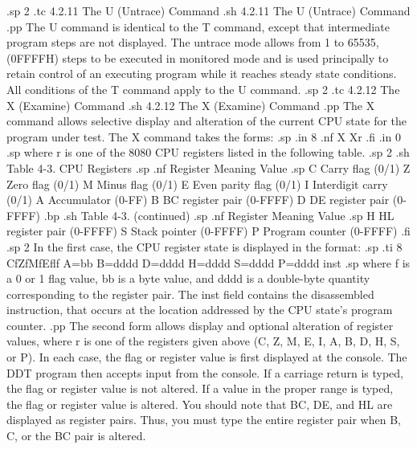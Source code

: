 .sp 2
.tc         4.2.11 The U (Untrace) Command
.sh
4.2.11  The U (Untrace) Command
.pp
The U command is identical to the T command, except that 
intermediate program steps are not displayed.  The untrace mode 
allows from 1 to 65535, (0FFFFH) steps to be executed in monitored 
mode and is used principally to retain control of an executing 
program while it reaches steady state conditions.  All conditions 
of the T command apply to the U command.
.sp 2
.tc         4.2.12 The X (Examine) Command
.sh
4.2.12  The X (Examine) Command
.pp
The X command allows selective display and alteration of the 
current CPU state for the program under test.  The X command 
takes the forms:
.sp
.in 8
.nf
X
Xr
.fi
.in 0
.sp
where r is one of the 8080 CPU registers listed in the following table.
.sp 2
.sh
                    Table 4-3.  CPU Registers
.sp
.nf
            Register        Meaning           Value
.sp
               C        Carry flag            (0/1)
               Z        Zero flag             (0/1)
               M        Minus flag            (0/1)
               E        Even parity flag      (0/1)
               I        Interdigit carry      (0/1)
               A        Accumulator           (0-FF)
               B        BC register pair      (0-FFFF)
               D        DE register pair      (0-FFFF)
.bp
.sh
                     Table 4-3.  (continued)
.sp
.nf
            Register        Meaning           Value
.sp
               H        HL register pair      (0-FFFF)
               S        Stack pointer         (0-FFFF)
               P        Program counter       (0-FFFF)
.fi
.sp 2
In the first case, the CPU register state is displayed in the 
format:
.sp
.ti 8
CfZfMfEflf A=bb B=dddd D=dddd H=dddd S=dddd P=dddd inst
.sp
where f is a 0 or 1 flag value, bb is a byte value, and dddd is a 
double-byte quantity corresponding to the register pair.  The 
inst field contains the disassembled instruction, that occurs at 
the location addressed by the CPU state's program counter.
.pp
The second form allows display and optional alteration of 
register values, where r is one of the registers given above (C, 
Z, M, E, I, A, B, D, H, S, or P).  In each case, the flag or 
register value is first displayed at the console.  The DDT 
program then accepts input from the console.  If a carriage 
return is typed, the flag or register value is not altered.  If 
a value in the proper range is typed, the flag or register value 
is altered.  You should note that BC, DE, and HL are 
displayed as register pairs.  Thus, you must type the entire 
register pair when B, C, or the BC pair is altered.
